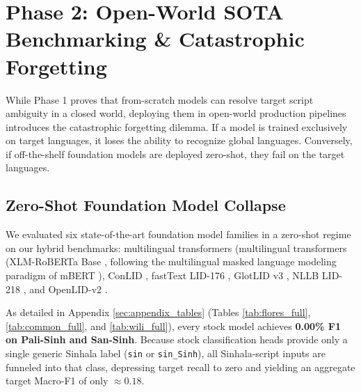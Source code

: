 \documentclass[11pt]{article}
\begin{document}
\section{Phase 2: Open-World SOTA Benchmarking \& Catastrophic Forgetting}

While Phase 1 proves that from-scratch models can resolve target script ambiguity in a closed world, deploying them in open-world production pipelines introduces the catastrophic forgetting dilemma. If a model is trained exclusively on target languages, it loses the ability to recognize global languages. Conversely, if off-the-shelf foundation models are deployed zero-shot, they fail on the target languages.


\subsection{Zero-Shot Foundation Model Collapse}
We evaluated six state-of-the-art foundation model families in a zero-shot regime on our hybrid benchmarks: multilingual transformers (multilingual transformers (XLM-RoBERTa Base \cite{conneau2020unsupervised}, following the multilingual masked language modeling paradigm of mBERT \cite{devlin2019bert}), ConLID \cite{dunn2023commonlid}, fastText LID-176 \cite{joulin2017bag}, GlotLID v3 \cite{kargaran2023glotlid}, NLLB LID-218 \cite{nllb2022}, and OpenLID-v2 \cite{burchell2023openlid}.

As detailed in Appendix \ref{sec:appendix_tables} (Tables \ref{tab:flores_full}, \ref{tab:common_full}, and \ref{tab:wili_full}), every stock model achieves \textbf{0.00\% F1 on Pali-Sinh and San-Sinh}. Because stock classification heads provide only a single generic Sinhala label (\texttt{sin} or \texttt{sin\_Sinh}), all Sinhala-script inputs are funneled into that class, depressing target recall to zero and yielding an aggregate target Macro-F1 of only $\approx 0.18$.
\end{document}
